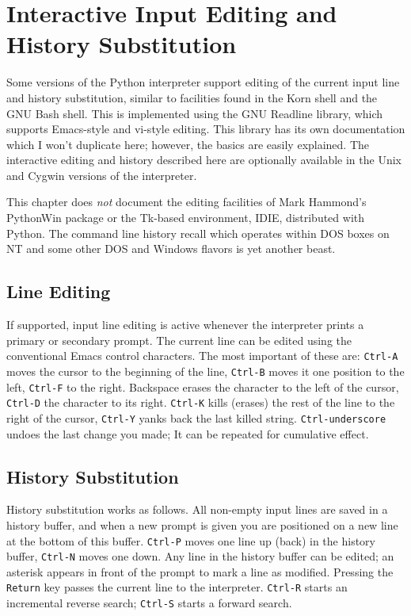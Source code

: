 \documentclass[UTF8]{article}
\begin{document}
\section{Interactive Input Editing and History Substitution}
Some versions of the Python interpreter support editing of the current input line and history
substitution, similar to facilities found in the Korn shell and the GNU Bash shell. This is
implemented using the GNU Readline library, which supports Emacs-style and vi-style editing. This
library has its own documentation which I won't duplicate here; however, the basics are easily
explained. The interactive editing and history described here are optionally available in the Unix
and Cygwin versions of the interpreter.

This chapter does \emph{not} document the editing facilities of Mark Hammond's PythonWin package or
the Tk-based environment, IDIE, distributed with Python. The command line history recall which
operates within DOS boxes on NT and some other DOS and Windows flavors is yet another beast.

\subsection{Line Editing}
If supported, input line editing is active whenever the interpreter prints a primary or secondary
prompt. The current line can be edited using the conventional Emacs control characters. The most
important of these are: \texttt{Ctrl-A} moves the cursor to the beginning of the line,
\texttt{Ctrl-B} moves it one position to the left, \texttt{Ctrl-F} to the right. Backspace erases
the character to the left of the cursor, \texttt{Ctrl-D} the character to its right.
\texttt{Ctrl-K} kills (erases) the rest of the line to the right of the cursor, \texttt{Ctrl-Y}
yanks back the last killed string. \texttt{Ctrl-underscore} undoes the last change you made; It can
be repeated for cumulative effect.

\subsection{History Substitution}
History substitution works as follows. All non-empty input lines are saved in a history buffer, and
when a new prompt is given you are positioned on a new line at the bottom of this buffer.
\texttt{Ctrl-P} moves one line up (back) in the history buffer, \texttt{Ctrl-N} moves one down. Any
line in the history buffer can be edited; an asterisk appears in front of the prompt to mark a line
as modified. Pressing the \texttt{Return} key passes the current line to the interpreter.
\texttt{Ctrl-R} starts an incremental reverse search; \texttt{Ctrl-S} starts a forward search.
\end{document}
